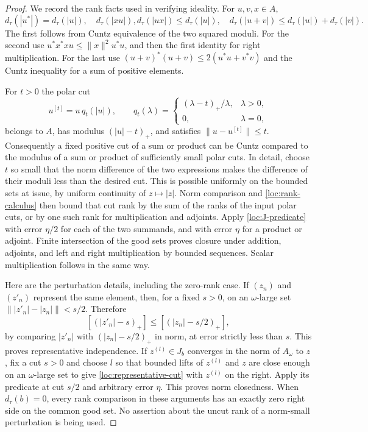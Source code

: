 \begin{proof}
We record the rank facts used in verifying ideality.  For $u,v,x\in A$,
\begin{equation}\label{loc:rank-calculus}
 d_\tau(|u^*|)=d_\tau(|u|),\quad
 d_\tau(|xu|),d_\tau(|ux|)\le d_\tau(|u|),\quad
 d_\tau(|u+v|)\le d_\tau(|u|)+d_\tau(|v|).
\end{equation}
The first follows from Cuntz equivalence of the two squared moduli.
For the second use $u^*x^*xu\le\|x\|^2u^*u$, and then the first
identity for right multiplication.  For the last use
$(u+v)^*(u+v)\le2(u^*u+v^*v)$ and the Cuntz inequality for a sum of
positive elements.

For $t>0$ the polar cut
\[
 u^{[t]}=u\,q_t(|u|),\qquad
 q_t(\lambda)=
 \begin{cases}(\lambda-t)_+/\lambda,&\lambda>0,\\0,&\lambda=0,
 \end{cases}
\]
belongs to $A$, has modulus $(|u|-t)_+$, and satisfies
$\|u-u^{[t]}\|\le t$.  Consequently a fixed positive cut of a sum or
product can be Cuntz compared to the modulus of a sum or product of
sufficiently small polar cuts.  In detail, choose $t$ so small that
the norm difference of the two expressions makes the difference of
their moduli less than the desired cut.  This is possible uniformly
on the bounded sets at issue, by uniform continuity of
$z\mapsto|z|$.  Norm comparison and \eqref{loc:rank-calculus} then bound
that cut rank by the sum of the ranks of the input polar cuts, or by
one such rank for multiplication and adjoints.  Apply
\eqref{loc:J-predicate} with error $\eta/2$ for each of the two
summands, and with error $\eta$ for a product or adjoint.  Finite
intersection of the good sets proves closure under addition,
adjoints, and left and right multiplication by bounded sequences.
Scalar multiplication follows in the same way.

Here are the perturbation details, including the zero-rank case.
If $(z_n)$ and $(z'_n)$ represent the same element, then, for a fixed
$s>0$, on an $\omega$-large set
$\||z'_n|-|z_n|\|<s/2$.  Therefore
\begin{equation}\label{loc:representative-cut}
 [ (|z'_n|-s)_+ ]\le[ (|z_n|-s/2)_+ ],
\end{equation}
by comparing $|z'_n|$ with $(|z_n|-s/2)_+$ in norm, at error strictly
less than $s$.  This proves representative independence.  If
$z^{(l)}\in J_b$ converges in the norm of $A_\omega$ to $z$, fix a cut
$s>0$ and choose $l$ so that bounded lifts of $z^{(l)}$ and $z$ are
close enough on an $\omega$-large set to give
\eqref{loc:representative-cut} with $z^{(l)}$ on the right.  Apply its
predicate at cut $s/2$ and arbitrary error $\eta$.  This proves norm
closedness.  When $d_\tau(b)=0$, every rank comparison in these
arguments has an exactly zero right side on the common good set.
No assertion about the uncut rank of a norm-small perturbation is
being used.


\end{proof}

